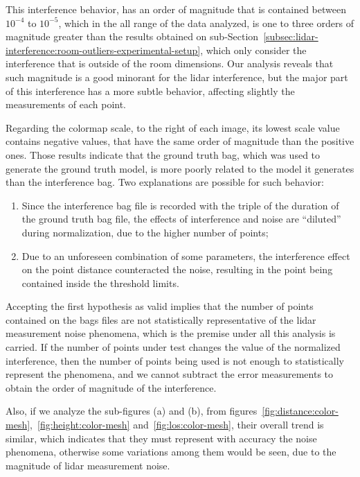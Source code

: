 This interference behavior, has an order of magnitude that is contained between $10^{-4}$ to $10^{-5}$, which in the all range of the data analyzed, is one to three orders of magnitude greater than the results obtained on sub-Section~\ref{subsec:lidar-interference:room-outliers-experimental-setup}, which only consider the interference that is outside of the room dimensions. Our analysis reveals that such magnitude is a good minorant for the \ac{lidar} interference, but the major part of this interference has a more subtle behavior, affecting slightly the measurements of each point.

Regarding the colormap scale, to the right of each image, its lowest scale value contains negative values, that have the same order of magnitude than the positive ones. Those results indicate that the ground truth bag, which was used to generate the ground truth model, is more poorly related to the model it generates than the interference bag. Two explanations are possible for such behavior:

\begin{enumerate}
	\item Since the interference bag file is recorded with the triple of the duration of the ground truth bag file, the effects of interference and noise are ``diluted'' during normalization, due to the higher number of points;
	\item Due to an unforeseen  combination of some parameters, the interference effect on the point distance counteracted the noise, resulting in the point being contained inside the threshold limits.
\end{enumerate}

Accepting the first hypothesis as valid implies that the number of points contained on the bags files are not statistically representative of the \ac{lidar} measurement noise phenomena, which is the premise under all this analysis is carried. If the number of points under test changes the value of the normalized interference, then the number of points being used is not enough to statistically represent the phenomena, and we cannot subtract the error measurements to obtain the order of magnitude of the interference.

Also, if we analyze the sub-figures (a) and (b), from figures~\ref{fig:distance:color-mesh},~\ref{fig:height:color-mesh} and~\ref{fig:los:color-mesh}, their overall trend is similar, which indicates that they must represent with accuracy the noise phenomena, otherwise some variations among them would be seen, due to the magnitude of \ac{lidar} measurement noise.


